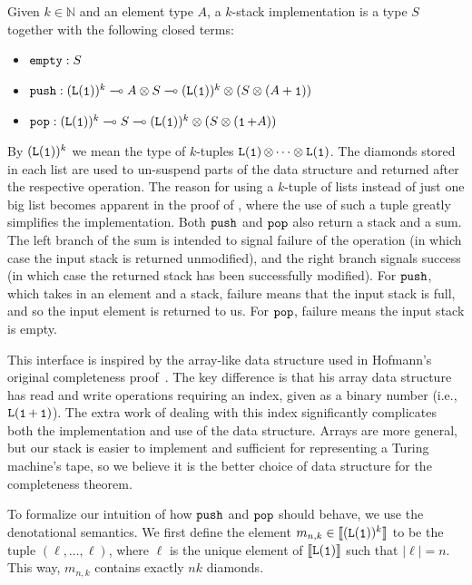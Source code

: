 \begin{definition}
Given $k \in \mathbb N$ and an element type $A$, a $k$-stack implementation is a type $S$ together with the following closed terms:
\begin{itemize}
  \item $\mathtt{empty} : S$
  \item $\code{push} : \tparr{(\tplist{\tpunit})^k}{\tparr{\tptens{A}{S}}{\tptens{(\tplist{\tpunit})^k}{(\tptens{S}{(\tpsum{A}{\tpunit})})}}}$
  \item $\code{pop} : \tparr{(\tplist{\tpunit})^k}{\tparr{S}{\tptens{(\tplist{\tpunit})^k}{(\tptens{S}{(\tpsum{\tpunit}{A})})}}}$
\end{itemize}
\end{definition}

By $(\tplist{\tpunit})^k$ we mean the type of $k$-tuples $\tplist{\tpunit} \otimes \cdots \otimes \tplist{\tpunit}$. The diamonds stored in each list are used to un-suspend parts of the data structure and returned after the respective operation. The reason for using a $k$-tuple of lists instead of just one big list becomes apparent in the proof of , where the use of such a tuple greatly simplifies the implementation.
%
Both $\mathtt{push}$ and $\mathtt{pop}$ also return a stack and a sum. The left branch of the sum is intended to signal failure of the operation (in which case the input stack is returned unmodified), and the right branch signals success (in which case the returned stack has been successfully modified).
%
For $\mathtt{push}$, which takes in an element and a stack, failure means that the input stack is full, and so the input element is returned to us. For $\mathtt{pop}$, failure means the input stack is empty.

This interface is inspired by the array-like data structure used in Hofmann's original completeness proof~\cite{hofmannStrengthNonsizeIncreasing2002}. The key difference is that his array data structure has read and write operations requiring an index, given as a binary \lfpl number (i.e., $\tplist{\tpsum{\tpunit}{\tpunit}}$). The extra work of dealing with this index significantly complicates both the implementation and use of the data structure.
%
Arrays are more general, but our stack is easier to implement and sufficient for representing a Turing machine's tape, so we believe it is the better choice of data structure for the completeness theorem.

To formalize our intuition of how $\mathtt{push}$ and $\mathtt{pop}$ should behave, we use the denotational semantics. We first define the element $m_{n,k} \in \tpsem{(\tplist{\tpunit})^k}$ to be the tuple $(\ell, \ldots, \ell)$, where $\ell$ is the unique element of $\tpsem{\tplist{\tpunit}}$ such that $|\ell| = n$. This way, $m_{n,k}$ contains exactly $nk$ diamonds.

